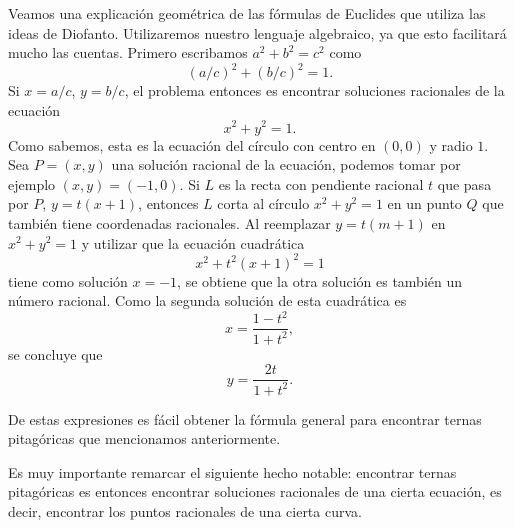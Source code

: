 Veamos una explicación geométrica de las fórmulas de Euclides que utiliza las
ideas de Diofanto. Utilizaremos nuestro lenguaje algebraico, ya que esto
facilitará mucho las cuentas.  Primero escribamos $a^2+b^2=c^2$ como
\[
	\left(a/c\right)^2+\left(b/c\right)^2=1.
\]
Si $x=a/c$, $y=b/c$, el problema entonces es encontrar soluciones racionales de 
la ecuación 
\[
	x^2+y^2=1.
\]
Como sabemos, esta es la ecuación del círculo con centro en $(0,0)$ y radio
$1$.  Sea $P=(x,y)$ una solución racional de la ecuación, podemos tomar por
ejemplo $(x,y)=(-1,0)$. Si $L$ es la recta con pendiente racional $t$ que pasa
por $P$, $y=t(x+1)$, entonces $L$ corta al círculo $x^2+y^2=1$ en un punto $Q$
que también tiene coordenadas racionales. Al reemplazar $y=t(m+1)$ en
$x^2+y^2=1$ y utilizar que la ecuación cuadrática
\[
	x^2+t^2(x+1)^2=1
\]
tiene como solución $x=-1$, se obtiene que la otra solución es también un
número racional. Como la segunda solución de esta cuadrática es
\[
	x=\frac{1-t^2}{1+t^2},
\]
se concluye que \[
	y=\frac{2t}{1+t^2}.
\]

De estas expresiones es fácil obtener la fórmula general para encontrar ternas
pitagóricas que mencionamos anteriormente. 

Es muy importante remarcar el siguiente hecho notable: encontrar ternas
pitagóricas es entonces encontrar soluciones racionales de una cierta ecuación, 
es decir, encontrar los puntos racionales de una cierta curva. 

